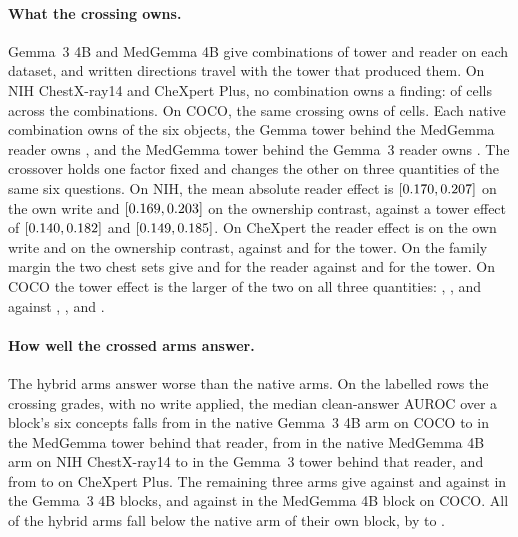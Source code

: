 \documentclass{article}
\begin{document}
\paragraph{What the crossing owns.} Gemma~3 4B and MedGemma 4B give \cfSwapCombos{} combinations of tower and reader on each dataset, and written directions travel with the tower that produced them. On NIH ChestX-ray14 and CheXpert Plus, no combination owns a finding: \cfSwapChestOwned{} of \cfSwapChestCells{} cells across the \cfSwapChestCombos{} combinations. On COCO, the same crossing owns \cfSwapCocoOwned{} of \cfSwapCocoCells{} cells. Each native combination owns \cfSwapCocoNativeMin{} of the six objects, the Gemma tower behind the MedGemma reader owns \cfSwapCocoGemmaTowerCross{}, and the MedGemma tower behind the Gemma~3 reader owns \cfSwapCocoMedTowerCross{}. The crossover holds one factor fixed and changes the other on three quantities of the same six questions. On NIH, the mean absolute reader effect is \cfSwapReaderNihMin{} $[0.170,0.207]$ on the own write and \cfSwapReaderNihOMin{} $[0.169,0.203]$ on the ownership contrast, against a tower effect of \cfSwapTowerNihMin{} $[0.140,0.182]$ and \cfSwapTowerNihOMin{} $[0.149,0.185]$. On CheXpert the reader effect is \cfSwapReaderChexMin{} on the own write and \cfSwapReaderChexOMin{} on the ownership contrast, against \cfSwapTowerChexMin{} and \cfSwapTowerChexOMin{} for the tower. On the family margin the two chest sets give \cfSwapReaderNihMMin{} and \cfSwapReaderChexMMin{} for the reader against \cfSwapTowerNihMMin{} and \cfSwapTowerChexMMin{} for the tower. On COCO the tower effect is the larger of the two on all three quantities: \cfSwapTowerCocoMin{}, \cfSwapTowerCocoOMin{}, and \cfSwapTowerCocoMMin{} against \cfSwapReaderCocoMin{}, \cfSwapReaderCocoOMin{}, and \cfSwapReaderCocoMMin{}.

\paragraph{How well the crossed arms answer.} The hybrid arms answer worse than the native arms. On the labelled rows the crossing grades, with no write applied, the median clean-answer AUROC over a block's six concepts falls from \cfSwapAnsNativeGemCoco{} in the native Gemma~3 4B arm on COCO to \cfSwapAnsHybridGemCoco{} in the MedGemma tower behind that reader, from \cfSwapAnsNativeMedNih{} in the native MedGemma 4B arm on NIH ChestX-ray14 to \cfSwapAnsHybridMedNih{} in the Gemma~3 tower behind that reader, and from \cfSwapAnsNativeMedChex{} to \cfSwapAnsHybridMedChex{} on CheXpert Plus. The remaining three arms give \cfSwapAnsNativeGemNih{} against \cfSwapAnsHybridGemNih{} and \cfSwapAnsNativeGemChex{} against \cfSwapAnsHybridGemChex{} in the Gemma~3 4B blocks, and \cfSwapAnsNativeMedCoco{} against \cfSwapAnsHybridMedCoco{} in the MedGemma 4B block on COCO. All \cfSwapAnsWorse{} of the \cfSwapAnsArms{} hybrid arms fall below the native arm of their own block, by \cfSwapAnsDropMin{} to \cfSwapAnsDropMax{}.
\end{document}
